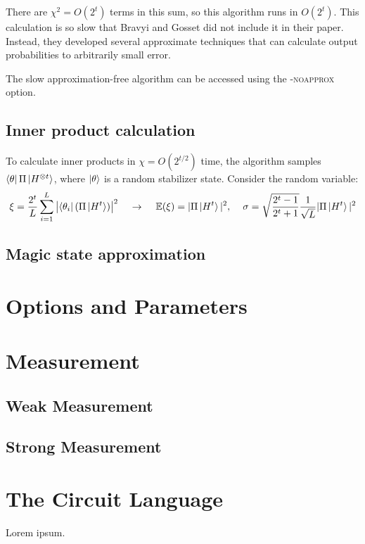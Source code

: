 \documentclass[11pt]{article}
\begin{document}
There are $\chi^2 = O(2^t)$ terms in this sum, so this algorithm runs in $O(2^t)$. This calculation is so slow that Bravyi and Gosset did not include it in their paper. Instead, they developed several approximate techniques that can calculate output probabilities to arbitrarily small error.

The slow approximation-free algorithm can be accessed using the \textsc{-noapprox} option.

\subsection{Inner product calculation}

To calculate inner products in $\chi = O(2^{t/2})$ time, the algorithm samples $\bra{\theta}\Pi\ket{H^{\otimes t}}$, where $\ket{\theta}$ is a random stabilizer state. Consider the random variable:
$$\xi = \frac{2^t}{L} \sum_{i=1}^L \left| \bra{\theta_i} (\Pi \ket{H^t}) \right|^2\hspace{4mm}\to\hspace{4mm} \mathbb{E}(\xi) = | \Pi \ket{H^t}|^2,\hspace{4mm} \sigma = \sqrt{\frac{2^t - 1}{2^t + 1}} \frac{1}{\sqrt{L}} | \Pi \ket{H^t}|^2 $$




\subsection{Magic state approximation}
\section{Options and Parameters}
\section{Measurement}
\subsection{Weak Measurement}
\subsection{Strong Measurement}
\section{The Circuit Language}
Lorem ipsum.
\end{document}
